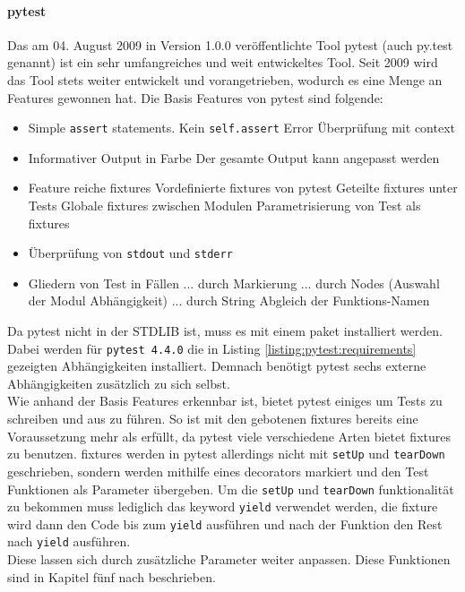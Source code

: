 \paragraph{pytest}\label{python-tools:pytest}\mbox{}
\newline
Das am 04. August 2009 in Version 1.0.0 veröffentlichte Tool pytest (auch py.test genannt)
ist ein sehr umfangreiches und weit entwickeltes Tool. Seit 2009 wird das Tool stets
weiter entwickelt und vorangetrieben, wodurch es eine Menge an Features gewonnen hat.
\noindent
Die Basis Features von pytest sind folgende:
\begin{itemize}
    \item Simple \lstinline{assert} statements.
    \subitem Kein \lstinline{self.assert}
    \subitem Error Überprüfung mit \Gls{context}
    \item Informativer Output in Farbe
    \subitem Der gesamte Output kann angepasst werden
    \item Feature reiche \Glspl{fixture}
    \subitem Vordefinierte \Glspl{fixture} von pytest
    \subitem Geteilte \Glspl{fixture} unter Tests
    \subitem Globale \Glspl{fixture} zwischen Modulen
    \subitem Parametrisierung von Test als \Glspl{fixture}
    \item Überprüfung von \lstinline{stdout} und \lstinline{stderr}
    \item Gliedern von Test in Fällen
    \subitem ... durch Markierung
    \subitem ... durch Nodes (Auswahl der Modul Abhängigkeit)
    \subitem ... durch String Abgleich der Funktions-Namen
\end{itemize}
\noindent
Da pytest nicht in der STDLIB ist, muss es mit einem \Gls{paket} installiert werden.
Dabei werden für \lstinline{pytest 4.4.0} die in Listing \ref{listing:pytest:requirements}
gezeigten Abhängigkeiten installiert. Demnach benötigt pytest sechs externe Abhängigkeiten
zusätzlich zu sich selbst.
\newline
\\
Wie anhand der Basis Features erkennbar ist, bietet pytest einiges um Tests zu schreiben und
aus zu führen. So ist mit den gebotenen \Glspl{fixture} bereits eine Voraussetzung mehr als
erfüllt, da pytest viele verschiedene Arten bietet \Glspl{fixture} zu benutzen.
\Glspl{fixture} werden in pytest allerdings nicht mit \lstinline{setUp} und \lstinline{tearDown}
geschrieben, sondern werden mithilfe eines \glspl{decorator} markiert und den Test Funktionen
als Parameter übergeben. Um die \lstinline{setUp} und \lstinline{tearDown} funktionalität zu
bekommen muss lediglich das keyword \lstinline{yield} verwendet werden, die \Gls{fixture} wird
dann den Code bis zum \lstinline{yield} ausführen und nach der Funktion den Rest nach
\lstinline{yield} ausführen.
\newline
\\
Diese lassen sich durch zusätzliche Parameter weiter anpassen. Diese
Funktionen sind in Kapitel fünf nach \cite{docs.pytest.org:4.4} beschrieben.

